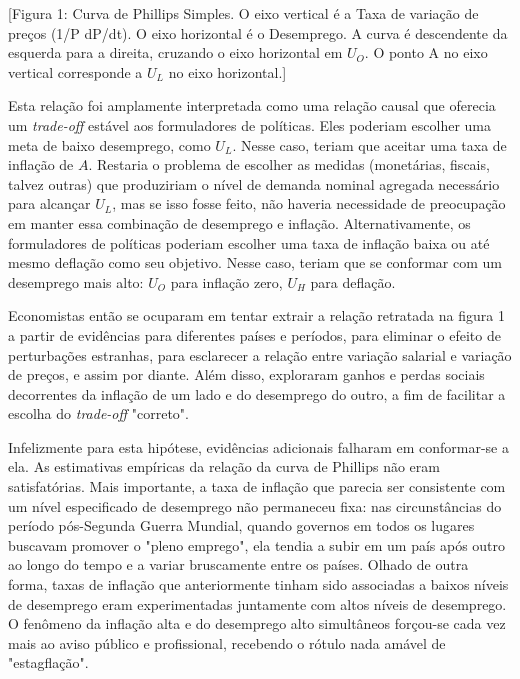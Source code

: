 \documentclass[12pt]{article}
\begin{document}
\begin{center}
[Figura 1: Curva de Phillips Simples. O eixo vertical é a Taxa de variação de preços (1/P dP/dt). O eixo horizontal é o Desemprego. A curva é descendente da esquerda para a direita, cruzando o eixo horizontal em $U_O$. O ponto A no eixo vertical corresponde a $U_L$ no eixo horizontal.]
\end{center}

Esta relação foi amplamente interpretada como uma relação causal que oferecia um \textit{trade-off} estável aos formuladores de políticas. Eles poderiam escolher uma meta de baixo desemprego, como $U_L$. Nesse caso, teriam que aceitar uma taxa de inflação de $A$. Restaria o problema de escolher as medidas (monetárias, fiscais, talvez outras) que produziriam o nível de demanda nominal agregada necessário para alcançar $U_L$, mas se isso fosse feito, não haveria necessidade de preocupação em manter essa combinação de desemprego e inflação. Alternativamente, os formuladores de políticas poderiam escolher uma taxa de inflação baixa ou até mesmo deflação como seu objetivo. Nesse caso, teriam que se conformar com um desemprego mais alto: $U_O$ para inflação zero, $U_H$ para deflação.

Economistas então se ocuparam em tentar extrair a relação retratada na figura 1 a partir de evidências para diferentes países e períodos, para eliminar o efeito de perturbações estranhas, para esclarecer a relação entre variação salarial e variação de preços, e assim por diante. Além disso, exploraram ganhos e perdas sociais decorrentes da inflação de um lado e do desemprego do outro, a fim de facilitar a escolha do \textit{trade-off} "correto".

Infelizmente para esta hipótese, evidências adicionais falharam em conformar-se a ela. As estimativas empíricas da relação da curva de Phillips não eram satisfatórias. Mais importante, a taxa de inflação que parecia ser consistente com um nível especificado de desemprego não permaneceu fixa: nas circunstâncias do período pós-Segunda Guerra Mundial, quando governos em todos os lugares buscavam promover o "pleno emprego", ela tendia a subir em um país após outro ao longo do tempo e a variar bruscamente entre os países. Olhado de outra forma, taxas de inflação que anteriormente tinham sido associadas a baixos níveis de desemprego eram experimentadas juntamente com altos níveis de desemprego. O fenômeno da inflação alta e do desemprego alto simultâneos forçou-se cada vez mais ao aviso público e profissional, recebendo o rótulo nada amável de "estagflação".
\end{document}
